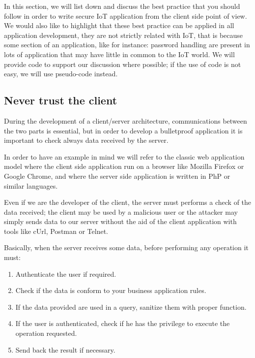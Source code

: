 In this section, we will list down and discuss the best practice that you should follow in order to write secure IoT application from the client side point of view.\newline
We would also like to highlight that these best practice can be applied in all application development, they are not strictly related with IoT, that is because some section of an application, like for instance: password handling are present in lots of application that may have little in common to the IoT world.\newline
We will provide code to support our discussion where possible; if the use of code is not easy, we will use pseudo-code instead.\newline

\subsection{Never trust the client}
During the development of a client/server architecture, communications between the two parts is essential, but in order to develop a bulletproof application it is important to check always data received by the server.\newline

In order to have an example in mind we will refer to the classic web application model where the client side application run on a browser like Mozilla Firefox or Google Chrome, and where the server side application is written in PhP or similar languages.\newline

Even if we are the developer of the client, the server must performs a check of the data received; the client may be used by a malicious user or the attacker may simply sends data to our server without the aid of the client application with tools like cUrl, Postman or Telnet.\newline

Basically, when the server receives some data, before performing any operation it must:
\begin{enumerate}
	\item Authenticate the user if required.
	\item Check if the data is conform to your business application rules.
	\item If the data provided are used in a query, sanitize them with proper function.
	\item If the user is authenticated, check if he has the privilege to execute the operation requested.
	\item Send back the result if necessary.
\end{enumerate}


